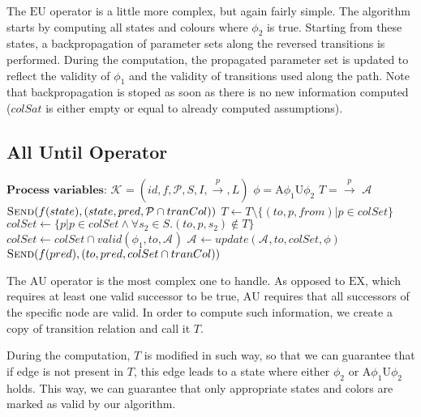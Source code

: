 \documentclass[12pt,oneside,draft]{fithesis2}
\newcommand{\as}[1][]{\ensuremath{\mathcal{A}_{#1}}}
\newcommand{\ks}[1][]{\ensuremath{\mathcal{K}_{#1}}}
\newcommand{\trans}[1]{\stackrel{#1}{\rightarrow}}
\newcommand{\eu}[2]{\ensuremath{\mbox{E} #1 \mbox{U} #2 }}
\newcommand{\au}[2]{\ensuremath{\mbox{A} #1 \mbox{U} #2 }}
\newcommand{\ex}[1]{\ensuremath{\mbox{EX} #1}}
\begin{document}
				The \eu{}{} operator is a little more complex, but again fairly simple. The algorithm starts by computing all states and colours where $\phi_2$ is true. Starting from these states, a backpropagation of parameter sets along the reversed transitions is performed. During the computation, the propagated parameter set is updated to reflect the validity of $\phi_1$ and the validity of transitions used along the path. Note that backpropagation is stoped as soon as there is no new information computed ($colSat$ is either empty or equal to already computed assumptions).
			
		    \subsection{All Until Operator}
				\begin{algorithmic}[1]
				\State $ \textbf{Process variables:} $
				\State $ \ks = (id, f, \mathcal{P}, S, I, \trans{p}, L) $ 
				\State $ \phi = \au{\phi_1}{\phi_2}  $ 
				\State $ T = \trans{p} $ 
				\State $ \as $ 
							\State $ \Call{Send}{f(state), (state, pred, \mathcal{P} \cap tranCol)} $
						\EndFor
					\EndFor
				\EndProcedure
					\State $ T \gets T \setminus \{ (to, p, from) | p \in colSet \} $
					\State $ colSet \gets \{ p | p \in colSet \wedge \forall s_2 \in S. (to, p, s_2) \notin T \} $
					\State $ colSet \gets colSet \cap valid(\phi_1, to, \as)$
					\If{$ colSet \neq \emptyset $ \textbf{and} $ colSet \setminus valid(\phi, to, \as) \neq \emptyset $}
						\State $ \as \gets update(\as, to, colSet, \phi) $
							\State $ \Call{Send}{f(pred), (to, pred, colSet \cap tranCol)} $
						\EndFor
					\EndIf
				\EndProcedure
				\end{algorithmic}	
				
				The \au{}{} operator is the most complex one to handle. As opposed to \ex{}{}, which requires at least one valid successor to be true, \au{}{} requires that all successors of the specific node are valid. In order to compute such information, we create a copy of transition relation and call it $T$. 
				
				During the computation, $T$ is modified in such way, so that we can guarantee that if edge is not present in $T$, this edge leads to a state where either $\phi_2$ or \au{\phi_1}{\phi_2} holds. This way, we can guarantee that only appropriate states and colors are marked as valid by our algorithm.
				
\end{document}
